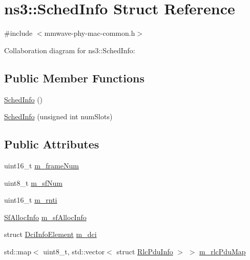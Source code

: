 \hypertarget{structns3_1_1SchedInfo}{}\section{ns3\+:\+:Sched\+Info Struct Reference}
\label{structns3_1_1SchedInfo}


{\ttfamily \#include $<$mmwave-\/phy-\/mac-\/common.\+h$>$}



Collaboration diagram for ns3\+:\+:Sched\+Info\+:
\subsection*{Public Member Functions}
\begin{DoxyCompactItemize}
\item 
\hyperlink{structns3_1_1SchedInfo_a5e3c79998ab7c1bd7003b928317dab23}{Sched\+Info} ()
\item 
\hyperlink{structns3_1_1SchedInfo_aea0021ecc6551b1cefd6f67baec0998a}{Sched\+Info} (unsigned int num\+Slots)
\end{DoxyCompactItemize}
\subsection*{Public Attributes}
\begin{DoxyCompactItemize}
\item 
uint16\+\_\+t \hyperlink{structns3_1_1SchedInfo_a13fe55e85049a876aaca26433fb71f32}{m\+\_\+frame\+Num}
\item 
uint8\+\_\+t \hyperlink{structns3_1_1SchedInfo_aed7bf8429de70b2e6665819dc76db025}{m\+\_\+sf\+Num}
\item 
uint16\+\_\+t \hyperlink{structns3_1_1SchedInfo_aba1d0070256bebadb54fb391158e1f3b}{m\+\_\+rnti}
\item 
\hyperlink{structns3_1_1SfAllocInfo}{Sf\+Alloc\+Info} \hyperlink{structns3_1_1SchedInfo_a2c05f265a92b2fddc86b417656794d9f}{m\+\_\+sf\+Alloc\+Info}
\item 
struct \hyperlink{structns3_1_1DciInfoElement}{Dci\+Info\+Element} \hyperlink{structns3_1_1SchedInfo_aeba1cfe33a36151464d91073b503dd46}{m\+\_\+dci}
\item 
std\+::map$<$ uint8\+\_\+t, std\+::vector$<$ struct \hyperlink{structns3_1_1RlcPduInfo}{Rlc\+Pdu\+Info} $>$ $>$ \hyperlink{structns3_1_1SchedInfo_a46d26a82bfd0ac170941471469e75ba9}{m\+\_\+rlc\+Pdu\+Map}
\end{DoxyCompactItemize}


